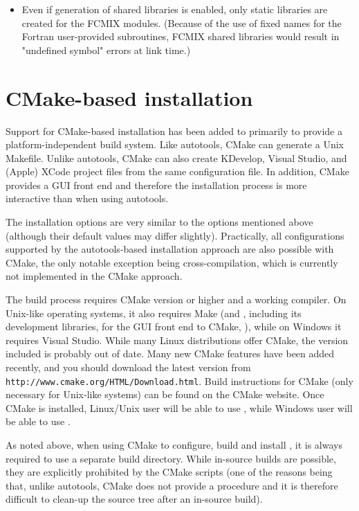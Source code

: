 \begin{itemize}
\item Even if generation of shared libraries is enabled, only static libraries
  are created for the FCMIX modules.  (Because of the use of fixed names for
  the Fortran user-provided subroutines, FCMIX shared libraries would result in
  "undefined symbol" errors at link time.)

\end{itemize}


\section{CMake-based installation}\label{s:cmake_inst}

Support for CMake-based installation has been added to {\sundials} primarily
to provide a platform-independent build system. Like autotools, CMake can generate a 
Unix Makefile. Unlike autotools, CMake can also create KDevelop, Visual Studio, and 
(Apple) XCode project files from the same configuration file.
In addition, CMake provides a GUI front end and therefore the installation process 
is more interactive than when using autotools.

The installation options are very similar to the options mentioned above (although 
their default values may differ slightly).
Practically, all configurations supported by the autotools-based installation approach
are also possible with CMake, the only notable exception being cross-compilation, which 
is currently not implemented in the CMake approach.

The {\sundials} build process requires CMake version  or
higher and a working compiler.  On Unix-like operating systems, it
also requires Make (and , including its development libraries,
for the GUI front end to CMake, ), while on Windows it
requires Visual Studio.  While many Linux distributions offer CMake,
the version included is probably out of date.  Many new CMake
features have been added recently, and you should download the latest
version from {\tt http://www.cmake.org/HTML/Download.html}.  Build
instructions for CMake (only necessary for Unix-like systems) can be
found on the CMake website.  Once CMake is installed, Linux/Unix user
will be able to use , while Windows user will be able to
use .

As noted above, when using CMake to configure, build and install {\sundials}, it is always
required to use a separate build directory. While in-source builds are possible, they are
explicitly prohibited by the {\sundials} CMake scripts (one of the reasons being that, unlike
autotools, CMake does not provide a  procedure and it is therefore
difficult to clean-up the source tree after an in-source build).

